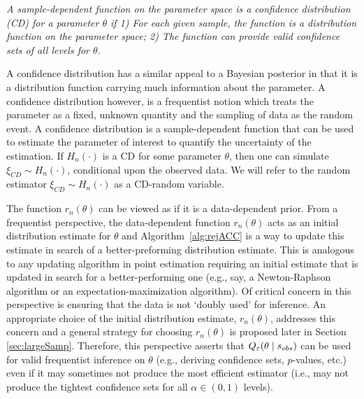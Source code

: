 { {\it A sample-dependent function on the parameter space is a {\sc confidence distribution (CD)} for a parameter $\theta$ if 1) For each given sample, the function is a distribution function on the parameter space; 2) The function can provide valid confidence sets of all levels for $\theta$.} } 
	
A confidence distribution has a similar appeal to a Bayesian posterior in that it is a distribution function carrying much information about the parameter. A confidence distribution however, is a frequentist notion which treats the parameter as a fixed, unknown quantity and the sampling of data as the random event.
A confidence distribution is a sample-dependent function that can be used to estimate the parameter of interest to quantify the uncertainty of the estimation. If $H_n(\cdot)$ is a CD for some parameter $\theta$, then one can simulate $\xi_{CD} \sim H_n{(\cdot)}$, conditional upon the observed data. We will refer to the random estimator $\xi_{CD} \sim H_n{(\cdot)}$ as a {\sc CD-random variable}. 


The function $r_{n}(\theta)$ can be viewed as if it is a data-dependent prior. From a frequentist perspective, the data-dependent function $r_{n}(\theta)$ acts as an initial distribution estimate for $\theta$ and Algorithm~\ref{alg:rejACC} is a way to update this estimate in search of a better-preforming distribution estimate. This is analogous to any updating algorithm in point estimation requiring an initial estimate that is updated in search for a better-performing one (e.g., say, a Newton-Raphson algorithm or an expectation-maximization algorithm). Of critical concern in this perspective is ensuring that the data is not `doubly used' for inference. An appropriate choice of the initial distribution estimate, $r_{n}(\theta)$, addresses this concern and a general strategy for choosing $r_n(\theta)$ is proposed later in  
Section \ref{sec:largeSamp}. Therefore, this perspective asserts that $Q_{\varepsilon}(\theta\mid s_{\relax obs})$ can be used for valid frequentist inference on $\theta$ (e.g., deriving confidence sets, $p$-values, etc.) even if it may sometimes not produce the most efficient estimator (i.e., may not produce the tightest confidence sets for all $\alpha\in (0,1)$ levels). 

